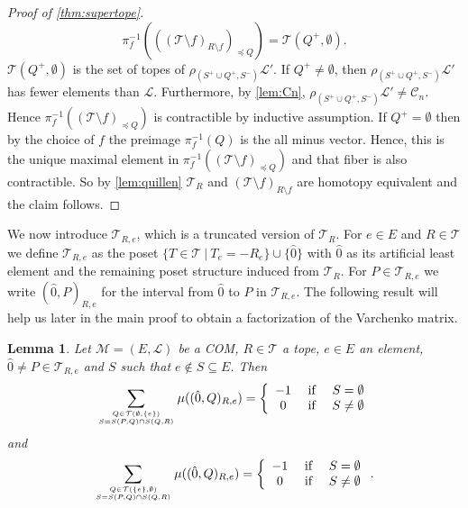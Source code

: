 \documentclass[12pt]{amsart}
\def\Tscr{{\mathcal T}}
\def\Lscr{{\mathcal L}}
\def\M{{\mathcal M}}
\theoremstyle{plain}
\newtheorem{Lemma}{Lemma}
\numberwithin{Lemma}{\DefaultNumberTheoremWithin}
\numberwithin{Claim}{\DefaultNumberTheoremWithin}
\numberwithin{Theorem}{\DefaultNumberTheoremWithin}
\numberwithin{Corollary}{\DefaultNumberTheoremWithin}
\numberwithin{Proposition}{\DefaultNumberTheoremWithin}
\numberwithin{Conjecture}{\DefaultNumberTheoremWithin}
\numberwithin{Situation}{\DefaultNumberTheoremWithin}
\numberwithin{Note}{\DefaultNumberTheoremWithin}
\theoremstyle{definition}
\numberwithin{Definition}{\DefaultNumberTheoremWithin}
\theoremstyle{definition}
\numberwithin{Question}{\DefaultNumberTheoremWithin}
\theoremstyle{definition}
\numberwithin{Problem}{\DefaultNumberTheoremWithin}
\theoremstyle{remark} \newtheorem{Remark}{Remark}
\numberwithin{Remark}{\DefaultNumberTheoremWithin}
\theoremstyle{remark}
\numberwithin{Example}{\DefaultNumberTheoremWithin}
\numberwithin{Case}{Lemma}
\numberwithin{Step}{Lemma}
\begin{document}
\begin{proof}[Proof of \ref{thm:supertope}]
  \[\pi_{f}^{-1}(((\Tscr\setminus f)_{R \setminus f})_{\preceq Q})=\Tscr(Q^+,\emptyset).\] 
  $\Tscr(Q^+,\emptyset)$ is the set of topes of $\rho_{(S^+\cup Q^+,S^-)}\Lscr'$. If $Q^+ \ne \emptyset$, then $\rho_{(S^+\cup Q^+,S^-)}\Lscr'$ has fewer elements than $\mathcal{L}$. Furthermore, by  \ref{lem:Cn}, $\rho_{(S^+\cup Q^+,S^-)}\Lscr' \neq \mathcal{C}_n$. Hence
  $\pi_{f}^{-1}((\Tscr\setminus f)_{\preceq Q})$ is contractible by inductive
  assumption. If $Q^+= \emptyset$ then by the choice of $f$ the
  preimage $\pi_{f}^{-1}(Q)$ is the all minus vector.
  Hence, this is the unique maximal element in
  $\pi_{f}^{-1}((\Tscr\setminus f)_{\preceq Q})$ and that fiber is also contractible. 
  So by \ref{lem:quillen} $\Tscr_R$ and $(\Tscr\setminus f)_{R \setminus f}$ are
  homotopy equivalent and the claim follows.
\end{proof}

We now introduce $\Tscr_{R,e}$, which is a truncated version of $\Tscr_R$. For $e \in E$ and $R \in \Tscr$ we define $\Tscr_{R,e}$ as the poset 
$\{ T \in \Tscr~|~T_e = -R_e\}\cup \{ \hat{0}\}$ 
with $\hat{0}$ as its artificial least element and the remaining poset 
structure induced from $\Tscr_R$.
For $P \in \Tscr_{R,e}$ we write $(\hat{0},P)_{R,e}$ for the interval from
$\hat{0}$ to $P$ in $\Tscr_{R,e}$. The following result will help us later in the main proof to obtain a factorization of the Varchenko matrix.

\begin{Lemma}
  \label{cor:crucial}
Let $\M=(E,\mathcal{L})$ be a COM, $R \in \Tscr$ a tope, $e\in E$ an element, $\hat{0} \neq P \in \Tscr_{R,e}$ and $S$ such that $e \not\in S\subseteq E$. Then 
\begin{align}\label{cruc1}
  \sum_{\genfrac{}{}{0pt}{}{Q \in \Tscr(\emptyset,\{e\})}{ S= S(P,Q) \cap S(Q,R)}}  \mu((\hat{0},Q)_{R,e}) = \left\{ \begin{array}{ccc} -1 & \mbox{~if~} & S = \emptyset \\ 
                                       0 & \mbox{~if~} & S \neq \emptyset 
                  \end{array} \right. 
\end{align}
and 
\begin{align}\label{cruc2}
  \sum_{\genfrac{}{}{0pt}{}{Q \in \Tscr(\{e\},\emptyset)}{ S= S(P,Q) \cap S(Q,R)}}  \mu((\hat{0},Q)_{R,e}) = \left\{ \begin{array}{ccc} -1 & \mbox{~if~} & S = \emptyset \\ 
                                       0 & \mbox{~if~} & S \neq \emptyset 
                  \end{array} \right. .
\end{align}
\end{Lemma}
\end{document}
